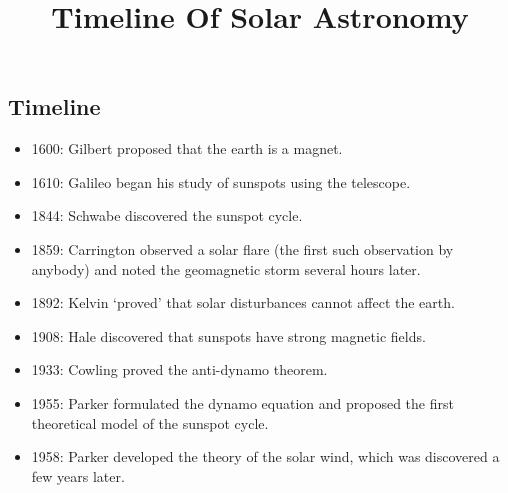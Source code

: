 \documentclass{../template/texnote}
\title{Timeline Of Solar Astronomy}
\begin{document}
    \maketitle {}
	\subsection{Timeline}
	\begin{itemize}
\item 1600: Gilbert proposed that the earth is a magnet. 
\item 1610: Galileo began his study of sunspots using the telescope. 
\item 1844: Schwabe discovered the sunspot cycle. 
\item 1859: Carrington observed a solar flare (the first such observation by anybody) and noted the geomagnetic storm several hours later.
\item 1892: Kelvin ‘proved’ that solar disturbances cannot affect the earth. 
\item 1908: Hale discovered that sunspots have strong magnetic fields. 
\item 1933: Cowling proved the anti-dynamo theorem. 
\item 1955: Parker formulated the dynamo equation and proposed the first theoretical model of the sunspot cycle. 
\item 1958: Parker developed the theory of the solar wind, which was discovered a few years later.
	\end{itemize}
\end{document}
